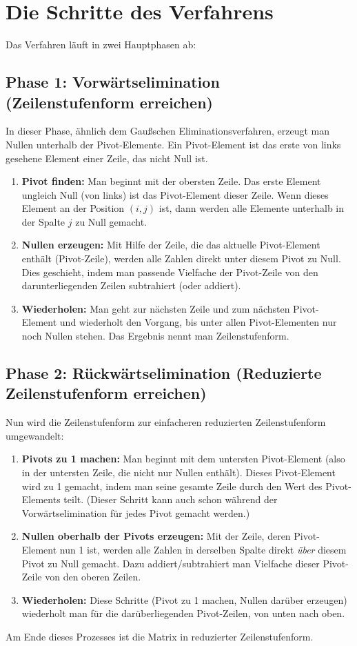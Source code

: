 \section{Die Schritte des Verfahrens}
Das Verfahren läuft in zwei Hauptphasen ab:

\subsection{Phase 1: Vorwärtselimination (Zeilenstufenform erreichen)}
In dieser Phase, ähnlich dem Gaußschen Eliminationsverfahren, erzeugt man
Nullen unterhalb der Pivot-Elemente. Ein Pivot-Element ist das erste von links
gesehene Element einer Zeile, das nicht Null ist.
\begin{enumerate}
    \item \textbf{Pivot finden:} Man beginnt mit der obersten Zeile. Das erste Element ungleich Null (von links) ist das Pivot-Element dieser Zeile. Wenn dieses Element an der Position $(i,j)$ ist, dann werden alle Elemente unterhalb in der Spalte $j$ zu Null gemacht.
    \item \textbf{Nullen erzeugen:} Mit Hilfe der Zeile, die das aktuelle Pivot-Element enthält (Pivot-Zeile), werden alle Zahlen direkt unter diesem Pivot zu Null. Dies geschieht, indem man passende Vielfache der Pivot-Zeile von den darunterliegenden Zeilen subtrahiert (oder addiert).
    \item \textbf{Wiederholen:} Man geht zur nächsten Zeile und zum nächsten Pivot-Element und wiederholt den Vorgang, bis unter allen Pivot-Elementen nur noch Nullen stehen. Das Ergebnis nennt man Zeilenstufenform.
\end{enumerate}

\subsection{Phase 2: Rückwärtselimination (Reduzierte Zeilenstufenform erreichen)}
Nun wird die Zeilenstufenform zur einfacheren reduzierten Zeilenstufenform
umgewandelt:
\begin{enumerate}
    \item \textbf{Pivots zu 1 machen:} Man beginnt mit dem untersten Pivot-Element (also in der untersten Zeile, die nicht nur Nullen enthält). Dieses Pivot-Element wird zu 1 gemacht, indem man seine gesamte Zeile durch den Wert des Pivot-Elements teilt. (Dieser Schritt kann auch schon während der Vorwärtselimination für jedes Pivot gemacht werden.)
    \item \textbf{Nullen oberhalb der Pivots erzeugen:} Mit der Zeile, deren Pivot-Element nun 1 ist, werden alle Zahlen in derselben Spalte direkt \textit{über} diesem Pivot zu Null gemacht. Dazu addiert/subtrahiert man Vielfache dieser Pivot-Zeile von den oberen Zeilen.
    \item \textbf{Wiederholen:} Diese Schritte (Pivot zu 1 machen, Nullen darüber erzeugen) wiederholt man für die darüberliegenden Pivot-Zeilen, von unten nach oben.
\end{enumerate}
Am Ende dieses Prozesses ist die Matrix in reduzierter Zeilenstufenform.

